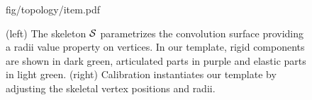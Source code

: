 \begin{figure}[h]
\centering
\begin{overpic} 
[width=\linewidth]
{fig/topology/item.pdf}
\end{overpic}
\caption{
% 
% 
(left) The skeleton $\mathcal{S}$ parametrizes the convolution surface providing a radii value property on vertices. 
% 
In our template, rigid components are shown in {\color{darkgreen}dark green}, articulated parts in {\color{purple}purple} and elastic parts in {\color{lightgreen}light green}.
% 
(right) Calibration instantiates our template by adjusting the skeletal vertex positions and radii. 
% 
% 
}
\label{fig:topology}
\end{figure}